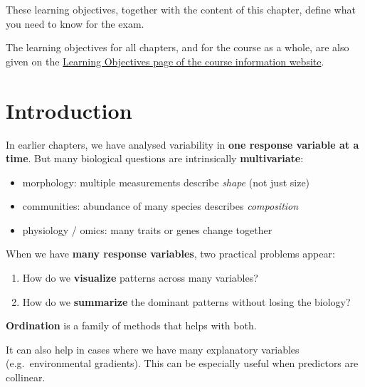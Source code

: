 \documentclass[
  letterpaper,
  8pt,
  a4paper]{book}
\providecommand{\tightlist}{%
  \setlength{\itemsep}{0pt}\setlength{\parskip}{0pt}}
\begin{document}
\begin{tcolorbox}
These learning objectives, together with the content of this chapter,
define what you need to know for the exam.

The learning objectives for all chapters, and for the course as a whole,
are also given on the
\href{https://opetchey.github.io/BIO144_Course_Information/3.1-learning-objectives.html}{Learning
Objectives page of the course information website}.

\end{tcolorbox}

\section*{Introduction}\label{introduction-7}


In earlier chapters, we have analysed variability in \textbf{one
response variable at a time}. But many biological questions are
intrinsically \textbf{multivariate}:

\begin{itemize}
\tightlist
\item
  morphology: multiple measurements describe \emph{shape} (not just
  size)
\item
  communities: abundance of many species describes \emph{composition}
\item
  physiology / omics: many traits or genes change together
\end{itemize}

When we have \textbf{many response variables}, two practical problems
appear:

\begin{enumerate}
\def\labelenumi{\arabic{enumi}.}
\tightlist
\item
  How do we \textbf{visualize} patterns across many variables?
\item
  How do we \textbf{summarize} the dominant patterns without losing the
  biology?
\end{enumerate}

\textbf{Ordination} is a family of methods that helps with both.

It can also help in cases where we have many explanatory variables
(e.g.~environmental gradients). This can be especially useful when
predictors are collinear.
\end{document}
